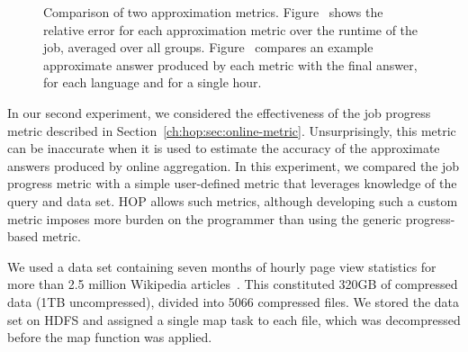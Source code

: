 \begin{figure}[ht]
\ssp
  \centering
  \caption{Comparison of two approximation
    metrics. Figure~\protect{} shows the relative error for
    each approximation metric over the runtime of the job, averaged over all
    groups. Figure~\protect{} compares an example approximate
    answer produced by each metric with the final answer, for each language and for a single hour.}
\label{fig:approx}
\end{figure}

In our second experiment, we considered the effectiveness of the job progress
metric described in Section~\ref{ch:hop:sec:online-metric}. Unsurprisingly, this metric
can be inaccurate when it is used to estimate the accuracy of the approximate
answers produced by online aggregation. In this experiment, we compared the job
progress metric with a simple user-defined metric that leverages knowledge of
the query and data set. HOP allows such metrics, although developing such a
custom metric imposes more burden on the programmer than using the generic
progress-based metric.

We used a data set containing seven months of hourly page view statistics for
more than 2.5 million Wikipedia articles~\cite{wikistats}. This constituted
320GB of compressed data (1TB uncompressed), divided into 5066 compressed
files. We stored the data set on HDFS and assigned a single map task to each
file, which was decompressed before the map function was applied.

